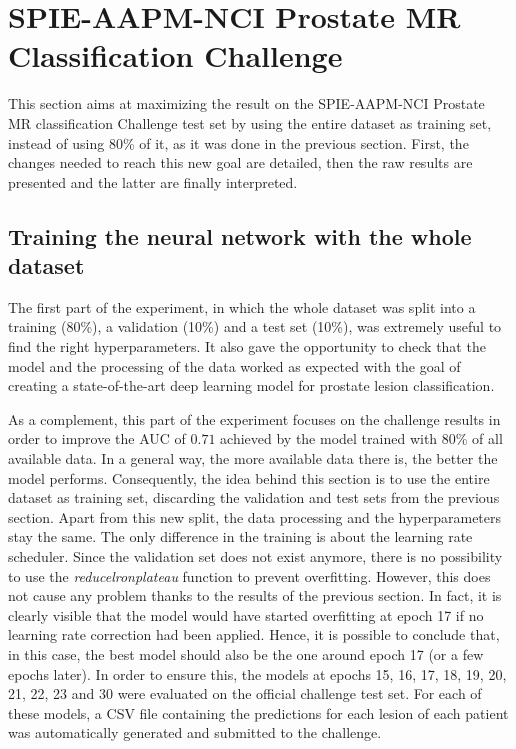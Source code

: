 \newpage
\section{SPIE-AAPM-NCI Prostate MR Classification Challenge}
\label{sec:classification_challenge}
\setlength{\marginparwidth}{3cm}\leavevmode {}This section aims at maximizing the result on the SPIE-AAPM-NCI Prostate MR classification Challenge test set by using the entire dataset as training set, instead of using 80\% of it, as it was done in the previous section. First, the changes needed to reach this new goal are detailed, then the raw results are presented and the latter are finally interpreted.

\subsection{Training the neural network with the whole dataset}
\setlength{\marginparwidth}{3cm}\leavevmode {}The first part of the experiment, in which the whole dataset was split into a training (80\%), a validation (10\%) and a test set (10\%), was extremely useful to find the right hyperparameters. It also gave the opportunity to check that the model and the processing of the data worked as expected with the goal of creating a state-of-the-art deep learning model for prostate lesion classification.

As a complement, this part of the experiment focuses on the challenge results in order to improve the AUC of $0.71$ achieved by the model trained with 80\% of all available data. In a general way, the more available data there is, the better the model performs. Consequently, the idea behind this section is to use the entire dataset as training set, discarding the validation and test sets from the previous section. Apart from this new split, the data processing and the hyperparameters stay the same. The only difference in the training is about the learning rate scheduler. Since the validation set does not exist anymore, there is no possibility to use the \textit{reducelronplateau} function to prevent overfitting. However, this does not cause any problem thanks to the results of the previous section. In fact, it is clearly visible that the model would have started overfitting at epoch 17 if no learning rate correction had been applied. Hence, it is possible to conclude that, in this case, the best model should also be the one around epoch 17 (or a few epochs later). In order to ensure this, the models at epochs 15, 16, 17, 18, 19, 20, 21, 22, 23 and 30 were evaluated on the official challenge test set. For each of these models, a CSV file containing the predictions for each lesion of each patient was automatically generated and submitted to the challenge.

